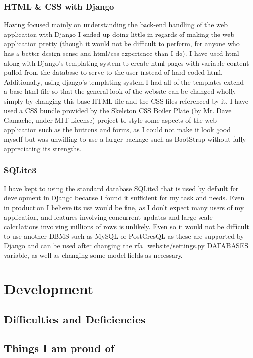 \documentclass[11pt,a4paper]{article}
\begin{document}
\subsubsection{HTML \& CSS with Django}
Having focused mainly on understanding the back-end handling of the web application with Django I ended up doing little in regards of making the web application pretty (though it would not be difficult to perform, for anyone who has a better design sense and html/css experience than I do). I have used html along with Django's templating system to create html pages with variable content pulled from the database to serve to the user instead of hard coded html. Additionally, using django's templating system I had all of the templates extend a base html file so that the general look of the website can be changed wholly simply by changing this base HTML file and the CSS files referenced by it. I have used a CSS bundle provided by the Skeleton CSS Boiler Plate (by Mr. Dave Gamache, under MIT License) project to style some aspects of the web application such as the buttons and forms, as I could not make it look good myself but was unwilling to use a larger package such as BootStrap without fully appreciating its strengths.
 
\subsubsection{SQLite3}
I have kept to using the standard database SQLite3 that is used by default for development in Django because I found it sufficient for my task and needs. Even in production I believe its use would be fine, as I don't expect many users of my application, and features involving concurrent updates and large scale calculations involving millions of rows is unlikely. Even so it would not be difficult to use another DBMS such as MySQL or PostGresQL as these are supported by Django and can be used after changing the rfa\_website/settings.py DATABASES variable, as well as changing some model fields as necessary.

\section{Development}
\subsection{Difficulties and Deficiencies}

\subsection{Things I am proud of}
\end{document}
